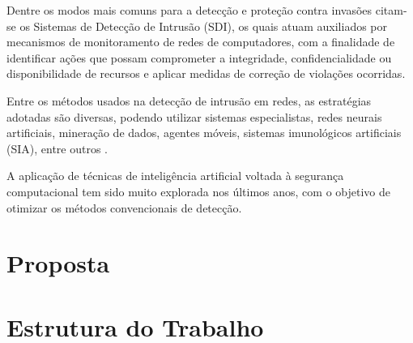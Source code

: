 Dentre os modos mais comuns para a detecção e proteção contra invasões citam-se os Sistemas de Detecção de Intrusão (SDI), os quais atuam auxiliados por mecanismos de monitoramento de redes de computadores, com a finalidade de identificar ações que possam comprometer a integridade, confidencialidade ou disponibilidade de recursos \cite{crosbie1995} e aplicar medidas de correção de violações ocorridas. 

Entre os métodos usados na detecção de intrusão em redes, as estratégias adotadas são diversas, podendo utilizar sistemas especialistas, redes neurais artificiais, mineração de dados, agentes móveis, sistemas imunológicos artificiais (SIA), entre outros \cite{machado2005,delima2005,sujatha2012,hashemi2013,paiva2011}.

A aplicação de técnicas de inteligência artificial voltada à segurança computacional tem sido muito explorada nos últimos anos, com o objetivo de otimizar os métodos convencionais de detecção.

\section{Proposta}

\section{Estrutura do Trabalho}

